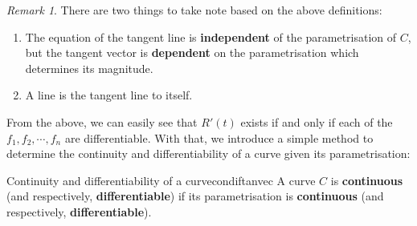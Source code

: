 \documentclass[math]{amznotes}
\theoremstyle{remark}
\newtheorem*{remark}{Remark}
\begin{document}
\begin{notebox}
    \begin{remark}
        There are two things to take note based on the above definitions:
        \begin{enumerate}
            \item The equation of the tangent line is {\color{red} \textbf{independent}} of the parametrisation of $C$, but the tangent vector is {\color{red} \textbf{dependent}} on the parametrisation which determines its magnitude.
            \item A line is the tangent line to itself.
        \end{enumerate}
    \end{remark}
\end{notebox}
From the above, we can easily see that $R'(t)$ exists if and only if each of the $f_1, f_2, \cdots, f_n$ are differentiable. With that, we introduce a simple method to determine the continuity and differentiability of a curve given its parametrisation:
\begin{thmbox}{Continuity and differentiability of a curve}{condiftanvec}
    A curve $C$ is {\color{red} \textbf{continuous}} (and respectively, {\color{red} \textbf{differentiable}}) if its parametrisation is {\color{red} \textbf{continuous}} (and respectively, {\color{red} \textbf{differentiable}}).
\end{thmbox}
\end{document}
